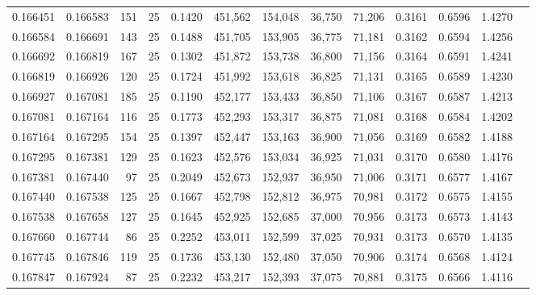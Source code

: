 \begin{tabular}{rrrrrrrrrrrrr}
0.166451 & 0.166583 &   151 &  25 &                                     0.1420 & 451,562 & 154,048 &  36,750 &  71,206 & 0.3161 & 0.6596 & 1.4270 \\
0.166584 & 0.166691 &   143 &  25 &                                     0.1488 & 451,705 & 153,905 &  36,775 &  71,181 & 0.3162 & 0.6594 & 1.4256 \\
0.166692 & 0.166819 &   167 &  25 &                                     0.1302 & 451,872 & 153,738 &  36,800 &  71,156 & 0.3164 & 0.6591 & 1.4241 \\
0.166819 & 0.166926 &   120 &  25 &                                     0.1724 & 451,992 & 153,618 &  36,825 &  71,131 & 0.3165 & 0.6589 & 1.4230 \\
0.166927 & 0.167081 &   185 &  25 &                                     0.1190 & 452,177 & 153,433 &  36,850 &  71,106 & 0.3167 & 0.6587 & 1.4213 \\
0.167081 & 0.167164 &   116 &  25 &                                     0.1773 & 452,293 & 153,317 &  36,875 &  71,081 & 0.3168 & 0.6584 & 1.4202 \\
0.167164 & 0.167295 &   154 &  25 &                                     0.1397 & 452,447 & 153,163 &  36,900 &  71,056 & 0.3169 & 0.6582 & 1.4188 \\
0.167295 & 0.167381 &   129 &  25 &                                     0.1623 & 452,576 & 153,034 &  36,925 &  71,031 & 0.3170 & 0.6580 & 1.4176 \\
0.167381 & 0.167440 &    97 &  25 &                                     0.2049 & 452,673 & 152,937 &  36,950 &  71,006 & 0.3171 & 0.6577 & 1.4167 \\
0.167440 & 0.167538 &   125 &  25 &                                     0.1667 & 452,798 & 152,812 &  36,975 &  70,981 & 0.3172 & 0.6575 & 1.4155 \\
0.167538 & 0.167658 &   127 &  25 &                                     0.1645 & 452,925 & 152,685 &  37,000 &  70,956 & 0.3173 & 0.6573 & 1.4143 \\
0.167660 & 0.167744 &    86 &  25 &                                     0.2252 & 453,011 & 152,599 &  37,025 &  70,931 & 0.3173 & 0.6570 & 1.4135 \\
0.167745 & 0.167846 &   119 &  25 &                                     0.1736 & 453,130 & 152,480 &  37,050 &  70,906 & 0.3174 & 0.6568 & 1.4124 \\
0.167847 & 0.167924 &    87 &  25 &                                     0.2232 & 453,217 & 152,393 &  37,075 &  70,881 & 0.3175 & 0.6566 & 1.4116 \\

\end{tabular}
